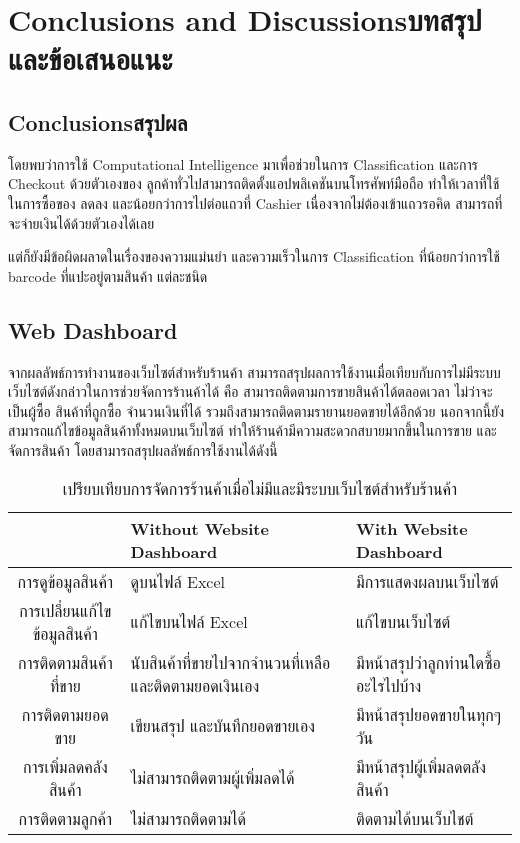 \chapter{\ifenglish Conclusions and Discussions\else บทสรุปและข้อเสนอแนะ\fi}

\section{\ifenglish Conclusions\else สรุปผล\fi}
โดยพบว่าการใช้ Computational Intelligence มาเพื่อช่วยในการ Classification และการ Checkout ด้วยตัวเองของ  ลูกค้าทั่วไปสามารถติดตั้งแอปพลิเคชันบนโทรศัพท์มือถือ
ทำให้เวลาที่ใช้ในการซื้อของ ลดลง และน้อยกว่าการไปต่อแถวที่ Cashier เนื่องจากไม่ต้องเข้าแถวรอคิด สามารถที่จะจ่ายเงินได้ด้วยตัวเองได้เลย

แต่ก็ยังมีข้อผิดผลาดในเรื่องของความแม่นยำ และความเร็วในการ Classification ที่น้อยกว่าการใช้ barcode ที่แปะอยู่ตามสินค้า แต่ละชนิด

\section{Web Dashboard}
จากผลลัพธ์การทำงานของเว็บไซต์สำหรับร้านค้า สามารถสรุปผลการใช้งานเมื่อเทียบกับการไม่มีระบบเว็บไซต์ดังกล่าวในการช่วยจัดการร้านค้าได้ คือ สามารถติดตามการขายสินค้าได้ตลอดเวลา ไม่ว่าจะเป็นผู้ซื้อ สินค้าที่ถูกซื้อ จำนวนเงินที่ได้ รวมถึงสามารถติดตามรายานยอดขายได้อีกด้วย นอกจากนี้ยังสามารถแก้ไขข้อมูลสินค้าทั้งหมดบนเว็บไซต์ ทำให้ร้านค้ามีความสะดวกสบายมากขึ้นในการขาย และจัดการสินค้า โดยสามารถสรุปผลลัพธ์การใช้งานได้ดังนี้

\begin{table}[htbp]
    \centering
    \caption{เปรียบเทียบการจัดการร้านค้าเมื่อไม่มีและมีระบบเว็บไซต์สำหรับร้านค้า}
    \begin{tabularx}{\textwidth}{ |c|X|X| }
        \hline
        \textbf{}            & \textbf{Without Website Dashboard}         & \textbf{With Website Dashboard} \\
        \hline
        การดูข้อมูลสินค้า         & ดูบนไฟล์ Excel                               & มีการแสดงผลบนเว็บไซต์              \\
        \hline
        การเปลี่ยนแก้ไขข้อมูลสินค้า & แก้ไขบนไฟล์ Excel                            & แก้ไขบนเว็บไซต์                    \\
        \hline
        การติดตามสินค้าที่ขาย     & นับสินค้าที่ขายไปจากจำนวนที่เหลือ และติดตามยอดเงินเอง & มีหน้าสรุปว่าลูกท่านใดซื้ออะไรไปบ้าง     \\
        \hline
        การติดตามยอดขาย       & เขียนสรุป และบันทึกยอดขายเอง                   & มีหน้าสรุปยอดขายในทุกๆวัน            \\
        \hline
        การเพิ่มลดคลังสินค้า      & ไม่สามารถติดตามผู้เพิ่มลดได้                      & มีหน้าสรุปผู้เพิ่มลดตลังสินค้า            \\
        \hline
        การติดตามลูกค้า         & ไม่สามารถติดตามได้                            & ติดตามได้บนเว็บไชต์                 \\
        \hline
    \end{tabularx}
\end{table}
